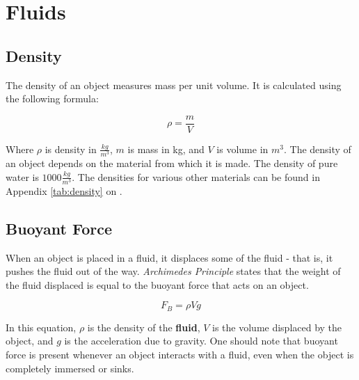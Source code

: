 \chapter{Fluids}
	\section{Density}
	The \gls{density} of an object measures mass per unit volume.  It is calculated using the following formula:
		\begin{mdframed}[backgroundcolor=orange!20!white]
		\begin{equation}
		\rho = \frac{m}{V}
			\label{equation:density}
		\end{equation}
	\end{mdframed}	
	Where $\rho$ is density in $\frac{kg}{m^3}$, $m$ is mass in kg, and $V$ is volume in $m^3$.  The density of an object depends on the material from which it is made.  The density of pure water is $1000 \frac{kg}{m^3}$. The densities for various other materials can be found in Appendix \ref{tab:density} on  .
	
	\section{Buoyant Force}
	
	When an object is placed in a fluid, it displaces some of the fluid - that is, it pushes the fluid out of the way.  \textit{Archimedes Principle}  states that the weight of the fluid displaced is equal to the buoyant force that acts on an object.  
			\begin{mdframed}[backgroundcolor=orange!20!white]
		\begin{equation}
			F_B = \rho V g
			\label{equation:buoyantforce}
		\end{equation}
	\end{mdframed}	
In this equation, $\rho$ is the density of the \textbf{fluid}, $V$ is the volume displaced by the object, and $g$ is the acceleration due to gravity.  One should note that buoyant force is present whenever an object interacts with a fluid, even when the object is completely immersed or sinks.


